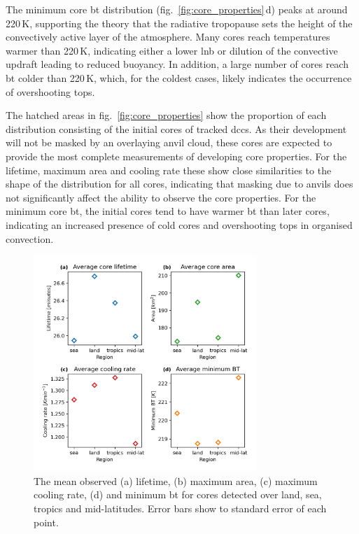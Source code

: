 The minimum core \acrshort{bt} distribution (fig.~\ref{fig:core_properties}\,d) peaks at around 220\,\unit{K}, supporting the theory that the radiative tropopause sets the height of the convectively active layer of the atmosphere.
Many cores reach temperatures warmer than 220\,K, indicating either a lower \acrshort{lnb} or dilution of the convective updraft leading to reduced buoyancy.
In addition, a large number of cores reach \acrshort{bt} colder than 220\,K, which, for the coldest cases, likely indicates the occurrence of overshooting tops.

The hatched areas in fig.~\ref{fig:core_properties} show the proportion of each distribution consisting of the initial cores of tracked \acrshort{dcc}s.
As their development will not be masked by an overlaying anvil cloud, these cores are expected to provide the most complete measurements of developing core properties.
For the lifetime, maximum area and cooling rate these show close similarities to the shape of the distribution for all cores, indicating that masking due to anvils does not significantly affect the ability to observe the core properties.
For the minimum core \acrshort{bt}, the initial cores tend to have warmer \acrshort{bt} than later cores, indicating an increased presence of cold cores and overshooting tops in organised convection.

\begin{figure}[tp]
    \centering
    \includegraphics[width=0.75\textwidth]{figures/chapter2_09.png}
    \caption[
    The mean observed lifetimes, maximum areas, cooling rates and \acrshort{bt} for cores detected over land, sea, tropics and mid-latitudes
    ]{
    The mean observed (a) lifetime, (b) maximum area, (c) maximum cooling rate, (d) and minimum \acrshort{bt} for cores detected over land, sea, tropics and mid-latitudes. Error bars show to standard error of each point.
    }
    \label{fig:core_region_mean_properties}
\end{figure}


